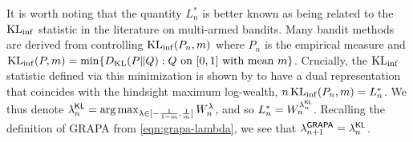 

It is worth noting that the quantity $L_n^*$ 
is better known as being related to the $\operatorname{KL}_{\inf}$ statistic in the literature on multi-armed bandits. Many bandit methods \citep{thesis} are derived from controlling $\operatorname{KL}_{\inf}(P_n, m)$
where $P_n$ is the empirical measure and $
    \operatorname{KL}_{\inf}(P, m) = \min\{ D_{\operatorname{KL}}(P \| Q) : Q \text{ on }[0,1] \text{ with mean }m \}$.
Crucially, the $\operatorname{KL}_{\inf}$ statistic defined via this minimization is shown by \cite{honda2010asymptotically} to have a dual representation that coincides with the hindsight maximum log-wealth, $n \operatorname{KL}_{\inf}(P_n, m ) = L_n^*$.
We thus denote $\lambda^{\mathsf{KL}}_n = \operatorname*{arg\,max}_{\lambda \in [-\frac{1}{1-m}, \frac{1}{m}]}  W_n^\lambda$, and so $L_n^* = W_n^{\lambda^{\mathsf{KL}}_n}$. Recalling the definition of GRAPA from \eqref{eqn:grapa-lambda}, we see that $\lambda^{\mathsf{GRAPA}}_{n+1} = \lambda^{\mathsf{KL}}_n$.

